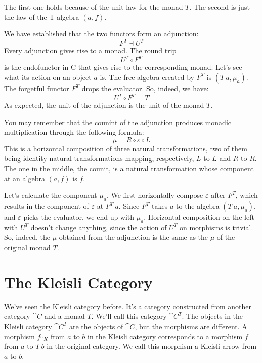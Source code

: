 \noindent
The first one holds because of the unit law for the monad $T$.
The second is just the law of the T-algebra $(a, f)$.

We have established that the two functors form an adjunction:
\[F^T \dashv U^T\]
Every adjunction gives rise to a monad. The round trip
\[U^T \circ F^T\]
is the endofunctor in C that gives rise to the corresponding monad.
Let's see what its action on an object $a$ is. The free algebra
created by $F^T$ is $(T\ a, \mu_a)$. The forgetful functor
$F^T$ drops the evaluator. So, indeed, we have:
\[U^T \circ F^T = T\]
As expected, the unit of the adjunction is the unit of the monad $T$.

You may remember that the counint of the adjunction produces monadic
multiplication through the following formula:
\[\mu = R \circ \varepsilon \circ L\]
This is a horizontal composition of three natural transformations, two
of them being identity natural transformations mapping, respectively,
$L$ to $L$ and $R$ to $R$. The one in the
middle, the counit, is a natural transformation whose component at an
algebra $(a, f)$ is $f$.

Let's calculate the component $\mu_a$. We first horizontally compose
$\varepsilon$ after $F^T$, which results in the component of
$\varepsilon$ at $F^T\ a$. Since $F^T$ takes $a$ to the
algebra $(T\ a, \mu_a)$, and $\varepsilon$ picks the evaluator, we end
up with $\mu_a$. Horizontal composition on the left with $U^T$
doesn't change anything, since the action of $U^T$ on morphisms is
trivial. So, indeed, the $\mu$ obtained from the adjunction is the
same as the $\mu$ of the original monad $T$.

\section{The Kleisli Category}

We've seen the Kleisli category before. It's a category constructed from
another category $\cat{C}$ and a monad $T$. We'll call this
category $\cat{C}^T$. The objects in the Kleisli category
$\cat{C}^T$ are the objects of $\cat{C}$, but the morphisms
are different. A morphism $f_{\cat{K}}$ from $a$ to $b$ in
the Kleisli category corresponds to a morphism $f$ from
$a$ to $T\ b$ in the original category. We call this
morphism a Kleisli arrow from $a$ to $b$.

